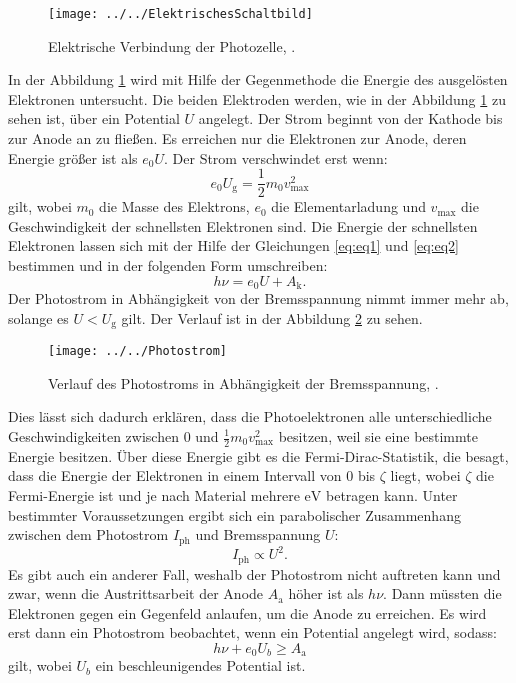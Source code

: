 \begin{figure}[h!]
	\centering
	\texttt{[image: ../../ElektrischesSchaltbild]}
	\caption{Elektrische Verbindung der Photozelle, \cite[5]{anleitung500}.}
	\label{fig:elektrischesschaltbild}
\end{figure}

In der Abbildung \ref{fig:elektrischesschaltbild} wird mit Hilfe der Gegenmethode die Energie des ausgelösten Elektronen untersucht. Die beiden Elektroden werden, wie in der Abbildung \ref{fig:elektrischesschaltbild} zu sehen ist, über ein Potential $U$ angelegt. Der Strom beginnt von der Kathode bis zur Anode an zu fließen. Es erreichen nur die Elektronen zur Anode, deren Energie größer ist als $e_0U$.
Der Strom verschwindet erst wenn:
\begin{equation}
\label{eq:eq2}
e_0U_\text{g} = \frac{1}{2}m_0v_\text{max}^2
\end{equation}
gilt, wobei $m_0$ die Masse des Elektrons, $e_0$ die Elementarladung und $v_\text{max}$ die Geschwindigkeit der schnellsten Elektronen sind. Die Energie der schnellsten Elektronen lassen sich mit der Hilfe der Gleichungen \ref{eq:eq1} und \ref{eq:eq2} bestimmen und in der folgenden Form umschreiben:
\begin{equation}
\label{eq:eq3}
h\nu = e_0U + A_\text{k}.
\end{equation}
Der Photostrom in Abhängigkeit von der Bremsspannung nimmt immer mehr ab, solange es $U < U_\text{g}$ gilt. Der Verlauf ist in der Abbildung \ref{fig:photostrom} zu sehen. 
\begin{figure}[h!]
	\centering
	\texttt{[image: ../../Photostrom]}
	\caption{Verlauf des Photostroms in Abhängigkeit der Bremsspannung, \cite[6]{anleitung500}.}
	\label{fig:photostrom}
\end{figure}
Dies lässt sich dadurch erklären, dass die Photoelektronen alle unterschiedliche Geschwindigkeiten zwischen $0$ und $\frac{1}{2}m_0v_\text{max}^2$ besitzen, weil sie eine bestimmte Energie besitzen. Über diese Energie gibt es die Fermi-Dirac-Statistik, die besagt, dass die Energie der Elektronen in einem Intervall von $0$ bis $\zeta$ liegt, wobei $\zeta$ die Fermi-Energie ist und je nach Material mehrere $\si{\electronvolt}$ betragen kann. 
Unter bestimmter Voraussetzungen ergibt sich ein parabolischer Zusammenhang zwischen dem Photostrom $I_\text{ph}$ und Bremsspannung $U$:
\begin{equation*}
I_\text{ph} \propto U^2.
\end{equation*}
Es gibt auch ein anderer Fall, weshalb der Photostrom nicht auftreten kann und zwar, wenn die Austrittsarbeit der Anode $A_\text{a}$ höher ist als $h \nu$. Dann müssten die Elektronen gegen ein Gegenfeld anlaufen, um die Anode zu erreichen. Es wird erst dann ein Photostrom beobachtet, wenn ein Potential angelegt wird, sodass:
\begin{equation*}
h \nu + e_0U_b \geq A_\text{a}
\end{equation*}
gilt, wobei $U_b$ ein beschleunigendes Potential ist. 